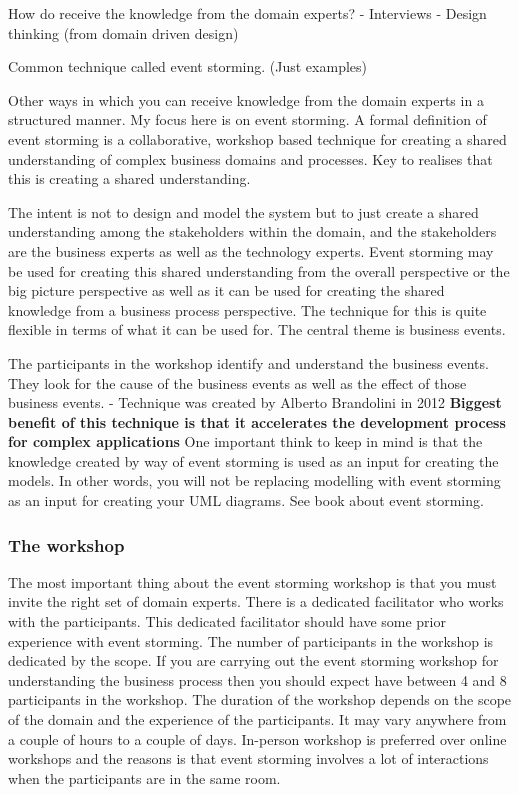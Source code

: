 \documentclass[a4paper, 11pt]{book}
\begin{document}
    How do receive the knowledge from the domain experts?
    - Interviews
    - Design thinking (from domain driven design)

    Common technique called event storming. (Just examples)

    Other ways in which you can receive knowledge from the domain experts in a structured manner.
    My focus here is on event storming.
    A formal definition of event storming is a collaborative, workshop based technique for creating a shared understanding of complex business domains and processes.
    Key to realises that this is creating a shared understanding.

    The intent is not to design and model the system but to just create a shared understanding among the stakeholders within the domain, and the stakeholders are the business experts as well as the technology experts.
    Event storming may be used for creating this shared understanding from the overall perspective or the big picture perspective as well as it can be used for creating the shared knowledge from a business process perspective.
    The technique for this is quite flexible in terms of what it can be used for.
    The central theme is business events.

    The participants in the workshop identify and understand the business events.
    They look for the cause of the business events as well as the effect of those business events.
    - Technique was created by Alberto Brandolini in 2012 %
    \textbf{Biggest benefit of this technique is that it accelerates the development process for complex applications}
    One important think to keep in mind is that the knowledge created by way of event storming is used as an input for creating the models.
    In other words, you will not be replacing modelling with event storming as an input for creating your UML diagrams. See book about event storming.

    \subsubsection{The workshop}
    The most important thing about the event storming workshop is that you must invite the right set of domain experts.
    There is a dedicated facilitator who works with the participants.
    This dedicated facilitator should have some prior experience with event storming.
    The number of participants in the workshop is dedicated by the scope.
    If you are carrying out the event storming workshop for understanding the business process then you should expect have between 4 and 8 participants in the workshop.
    The duration of the workshop depends on the scope of the domain and the experience of the participants.
    It may vary anywhere from a couple of hours to a couple of days.
    In-person workshop is preferred over online workshops and the reasons is that event storming involves a lot of interactions when the participants are in the same room.
\end{document}

